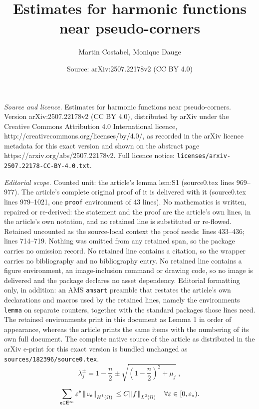 \documentclass[10pt,a4paper]{amsart}
\title{Estimates for harmonic functions near pseudo-corners}
\author{Martin Costabel, Monique Dauge}
\date{Source: arXiv:2507.22178v2 (CC BY 4.0)}
\newcommand {\DNorm}[2]{ \mathchoice
    {\|\ee #1\ee\|\dd{#2}\,}
    {\| #1 \|_{#2}}
    {\| #1 \|_{#2}}
    {\| #1 \|_{#2}} }
\newcommand{\dd}[1]{_{\raise-0.6ex\hbox{$\scriptstyle #1$}}}
\newcommand{\ee}{\hskip0.15ex}
\newcommand{\sfE}{{\mathsf E}}
\newcommand{\sfe}{{\mathsf e}}
\newcommand{\sfu}{{\mathsf u}}
\begin{document}
\maketitle

\noindent\emph{Source and licence.} Estimates for harmonic functions near pseudo-corners. Version arXiv:2507.22178v2 (CC BY 4.0), distributed by arXiv under the Creative Commons Attribution 4.0 International licence, http://creativecommons.org/licenses/by/4.0/, as recorded in the arXiv licence metadata for this exact version and shown on the abstract page https://arxiv.org/abs/2507.22178v2. Full licence notice: \texttt{licenses/arxiv-2507.22178-CC-BY-4.0.txt}.\par\smallskip

\noindent\textit{Editorial scope.} Counted unit: the article's lemma lem:S1 (source0.tex lines 969--977). The article's complete original proof of it is delivered with it (source0.tex lines 979--1021, one \texttt{proof} environment of 43 lines). No mathematics is written, repaired or re-derived: the statement and the proof are the article's own lines, in the article's own notation, and no retained line is substituted or re-flowed.  Retained uncounted as the source-local context the proof needs: lines 433--436; lines 714--719.  Nothing was omitted from any retained span, so the package carries no omission record.  No retained line contains a citation, so the wrapper carries no bibliography and no bibliography entry.  No retained line contains a figure environment, an image-inclusion command or drawing code, so no image is delivered and the package declares no asset dependency.  Editorial formatting only, in addition: an AMS \texttt{amsart} preamble that restates the article's own declarations and macros used by the retained lines, namely the environments \texttt{lemma} on separate counters, together with the standard packages those lines need.  The retained environments print in this document as Lemma 1 in order of appearance, whereas the article prints the same items with the numbering of its own full document.  The complete native source of the article as distributed in the arXiv e-print for this exact version is bundled unchanged as \texttt{sources/182396/source0.tex}.
\begin{equation}
\label{eq:lj}
  \lambda_j^\pm = 1-\frac{n}{2} \pm \sqrt{\left(1-\frac{n}{2}\right)^2 + \mu_j}\;,
\end{equation}

\begin{equation}
\label{eq:sfuepsb}
   \sum_{\sfe\in\sfE^\infty} \varepsilon^\sfe\,\DNorm{\sfu_\sfe}{H^1(\Omega)} 
   \le C \DNorm{f}{L^2(\Omega)}\quad
   \forall\varepsilon\in[0,\varepsilon_\star).
\end{equation}
\end{document}
